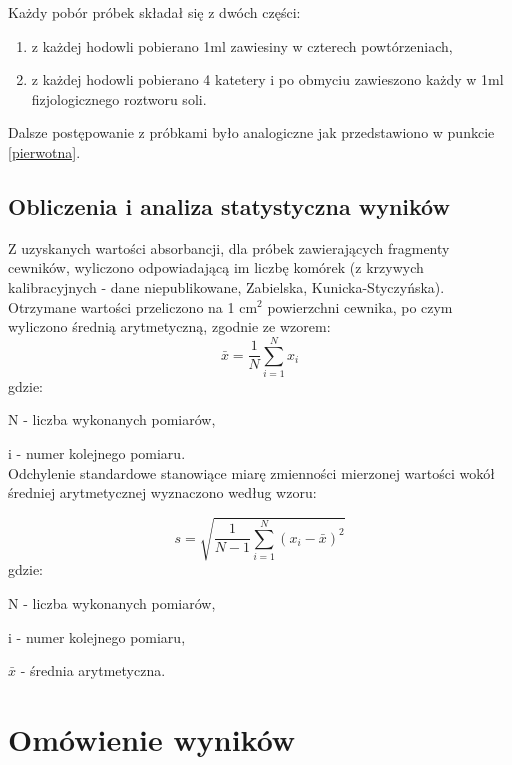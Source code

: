 \documentclass[11pt,a4paper]{report}
\begin{document}
Każdy pobór próbek składał się z dwóch części:
\begin{enumerate}
\item z każdej hodowli pobierano 1ml zawiesiny w czterech powtórzeniach,
\item z każdej hodowli pobierano 4 katetery i po obmyciu zawieszono każdy w 1ml fizjologicznego roztworu soli.
\end{enumerate}

Dalsze postępowanie z próbkami było analogiczne jak przedstawiono w punkcie \ref{pierwotna}.


\section{Obliczenia i analiza statystyczna wyników}
Z uzyskanych wartości absorbancji, dla próbek zawierających fragmenty cewników,  wyliczono odpowiadającą im liczbę komórek (z krzywych kalibracyjnych - dane niepublikowane, Zabielska, Kunicka-Styczyńska). Otrzymane wartości przeliczono na 1 cm$^2$ powierzchni cewnika, po czym wyliczono średnią arytmetyczną, zgodnie ze wzorem:
\begin{equation}
\bar{x}=\frac{1}{N}\sum_{i=1}^N x_i
\end{equation}
gdzie:

N - liczba wykonanych pomiarów,

i - numer kolejnego pomiaru.\\
Odchylenie standardowe stanowiące miarę zmienności mierzonej wartości wokół średniej arytmetycznej wyznaczono według wzoru:

\begin{equation}
s=\sqrt{\frac{1}{N-1}\sum_{i=1}^N(x_i-\bar{x})^2}
\end{equation}
gdzie:

N - liczba wykonanych pomiarów,

i - numer kolejnego pomiaru,

$\bar{x}$ - średnia arytmetyczna.\\

\chapter{Omówienie wyników}
\end{document}
